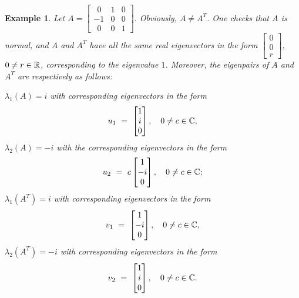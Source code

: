 \documentclass{article}
\newtheorem{exa}{Example}
\begin{document}
\begin{exa}\label{Exa:3by3}
\rm   Let
$A=\begin{bmatrix}
\ \ 0 & 1 &0  \\
-1 & 0 & 0\\
\ \ 0 & 0 & 1
\end{bmatrix}$. Obviously, $A\not = A^T$.
One checks that
$A$ is   normal,  and $A$ and $A^T$ have all the
same {real} eigenvectors in the form $\begin{bmatrix}
0  \\
0\\
r
\end{bmatrix}$, $0\not = r\in \Bbb R$,  corresponding to the eigenvalue $1$. Moreover, the eigenpairs of $A$ and $A^T$ are respectively as follows:
\medskip

\noindent
  $\lambda_1(A) =i$ with corresponding eigenvectors in the form  $$u_1 \ = \  \begin{bmatrix}
1  \\
i\\
0
\end{bmatrix}, \ \ \  0\not = c\in \Bbb C,$$
  $\lambda_2(A) =-i$ with the corresponding eigenvectors in the form  $$ u_2 \ = \ c \begin{bmatrix}
1  \\
-i\\
0
\end{bmatrix}, \ \ \  0\not = c\in \Bbb C; $$
$\lambda_1(A^T) =i$ with corresponding eigenvectors in the form  $$v_1 \ = \  \begin{bmatrix}
1  \\
-i\\
0
\end{bmatrix}, \ \ \ 0\not = c\in \Bbb C,$$
$\lambda_2(A^T) =-i$ with corresponding eigenvectors in the form  $$v_2 \ = \  \begin{bmatrix}
1  \\
i\\
0
\end{bmatrix}, \ \ \ 0\not = c\in \Bbb C.$$
\end{exa}
\end{document}
